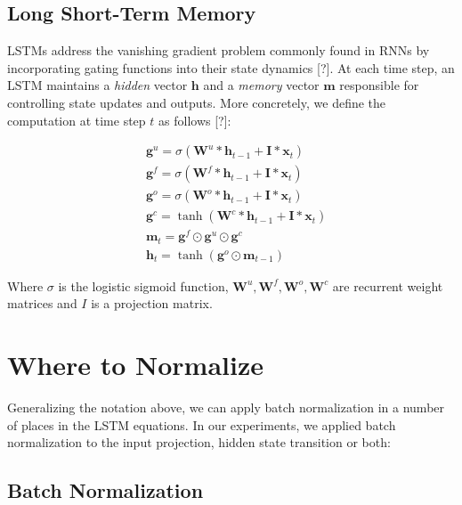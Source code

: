\documentclass{article}
\begin{document}
\subsection{Long Short-Term Memory}
LSTMs address the vanishing gradient problem commonly found in RNNs by incorporating gating functions into their state dynamics [?]. At each time step, an LSTM maintains a \textit{hidden} vector $\boldsymbol h$ and a \textit{memory} vector $\boldsymbol m$  responsible for controlling state updates and outputs. More concretely, we define the computation at time step $t$ as follows [?]:

\begin{equation}
\begin{split}
& \boldsymbol g^u = \sigma(\boldsymbol W^u * \boldsymbol h_{t-1} + \boldsymbol I * \boldsymbol x_t) \\
& \boldsymbol g^f = \sigma(\boldsymbol W^f * \boldsymbol h_{t-1} + \boldsymbol I * \boldsymbol x_t) \\
& \boldsymbol g^o = \sigma(\boldsymbol W^o * \boldsymbol h_{t-1} + \boldsymbol I * \boldsymbol x_t) \\
& \boldsymbol g^c = \tanh(\boldsymbol W^c * \boldsymbol h_{t-1} + \boldsymbol I * \boldsymbol x_t) \\
& \boldsymbol m_t = \boldsymbol g^f \odot \boldsymbol g^u \odot \boldsymbol g^c \\
& \boldsymbol h_t = \tanh(\boldsymbol g^o \odot \boldsymbol m_{t-1}) \nonumber
\end{split}
\end{equation}

Where $\sigma$ is the logistic sigmoid function, $\boldsymbol W^u, \boldsymbol W^f, \boldsymbol W^o, \boldsymbol W^c$ are recurrent weight matrices and $I$ is a projection matrix.

\section{Where to Normalize}

Generalizing the notation above, we can apply batch normalization in a number of places in the LSTM equations. In our experiments, we applied batch normalization to the input projection, hidden state transition or both:

\subsection{Batch Normalization}
\end{document}

